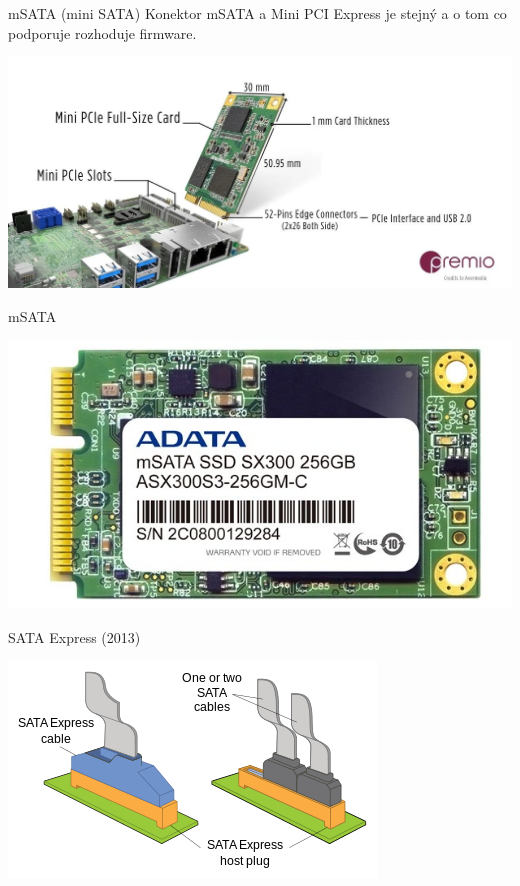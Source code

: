 \documentclass[aspectratio=43]{beamer}
\begin{document}
\begin{frame}{mSATA (mini SATA)}
	Konektor mSATA a Mini PCI Express je stejný a o tom co podporuje 
	rozhoduje firmware.
	\begin{center}
		\includegraphics[width=1\linewidth]{extrahovane_obrazky/mpcie.jpg}
	\end{center}
	
\end{frame}

\begin{frame}{mSATA}
	 
	\begin{center}
		\includegraphics[width=1\linewidth]{extrahovane_obrazky/img_2_page15_0.jpeg}
	\end{center}
\end{frame}


\begin{frame}{SATA Express (2013)}
	\begin{center}
		\includegraphics[width=1\linewidth]{extrahovane_obrazky/Sata-Express.png}
	\end{center}
	
\end{frame}
\end{document}
